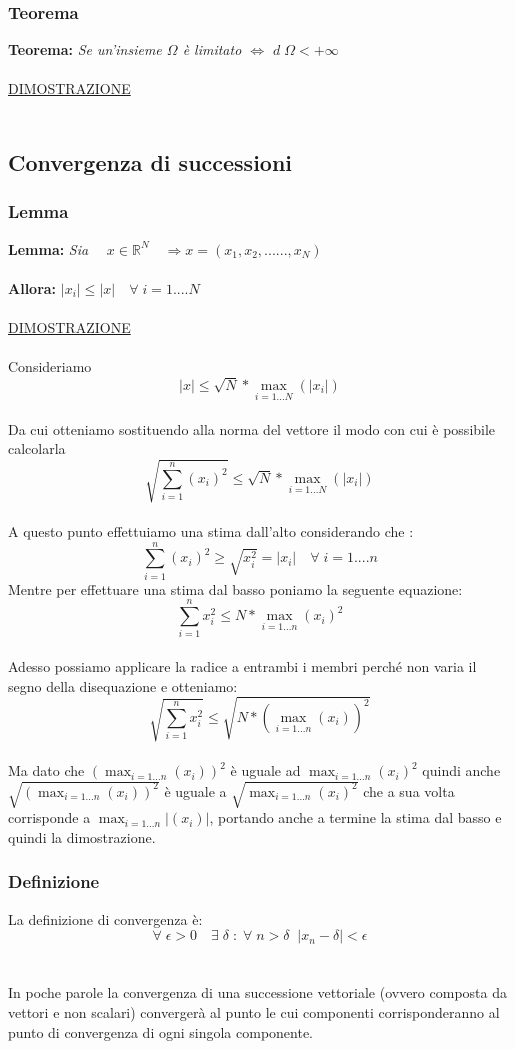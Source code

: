 \documentclass[fontsize = 20px, paper = a4]{article}
\begin{document}
\subsubsection{Teorema}
\textbf{Teorema: }\emph{Se un'insieme $\Omega$ è limitato $\Longleftrightarrow$ $d \; \Omega < +\infty$ }\\ \\ \underline{DIMOSTRAZIONE} \\ \\ 

\subsection{Convergenza di successioni}
\subsubsection{Lemma}
\textbf{Lemma: } \emph{Sia} $\quad x \in \mathbb{R}^N \quad \Longrightarrow x = (x_1,x_2,......,x_N)$ \\\\ 
\textbf{Allora: } \hspace{0.2cm}$|x_i| \le |x| \quad \forall \; i = 1....N $ \\ \\
\underline{DIMOSTRAZIONE} \\ \\
Consideriamo
$$|x| \le \sqrt{N} * \max_{i = 1...N}(|x_i|)$$ \\
Da cui otteniamo sostituendo alla norma del vettore il modo con cui è possibile calcolarla
$$\sqrt{\sum_{i = 1}^n (x_i)^2} \le \sqrt{N} * \max_{i = 1...N}(|x_i|)$$ \\
A questo punto effettuiamo una stima dall'alto considerando che :
$$\sum_{i = 1} ^ n (x_i)^2 \ge \sqrt{x_i ^2}= |x_i| \quad \forall \; i = 1....n$$
Mentre per effettuare una stima dal basso poniamo la seguente equazione:
$$\sum_{i = 1}^n x_i ^2 \le N * \max_{i = 1...n}(x_i)^2$$ \\
Adesso possiamo applicare la radice a entrambi i membri perché non varia il segno della disequazione  e otteniamo:
$$\sqrt{\sum_{i = 1}^n x_i ^2} \le \sqrt{ N * (\max_{i = 1...n}(x_i)) ^ 2}$$ \\
Ma dato che $(\max_{i = 1...n}(x_i))^2$ è uguale ad $\max_{i = 1...n}(x_i)^2$ quindi anche $\sqrt{(\max_{i = 1...n}(x_i))^2}$ è uguale a $\sqrt{\max_{i = 1...n}(x_i)^2}$ che a sua volta corrisponde a $\max_{i = 1...n}|(x_i)|$, portando anche a termine la stima dal basso e quindi la dimostrazione.
\subsubsection{Definizione}
La definizione di convergenza è: 
$$\forall \; \epsilon > 0 \quad \exists \; \delta \; : \; \forall \; n > \delta \; \; |x_n - \delta| < \epsilon$$ \\ \\
In poche parole la convergenza di una successione vettoriale (ovvero composta da vettori e non scalari) convergerà al punto le cui componenti corrisponderanno al punto di convergenza  di ogni singola componente.
\end{document}
